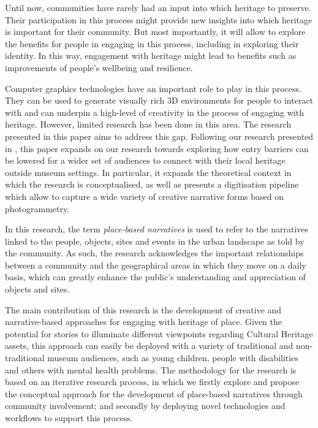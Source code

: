 \documentclass[acmlarge,screen,dvipsnames]{acmart}
\begin{document}
Until now, communities have rarely had an input into which heritage to preserve.
Their participation in this process might provide new insights into which
heritage is important for their community. But most importantly, it will allow to explore the benefits for people in engaging in this process, including in exploring their identity. In this way, engagement with heritage might lead to benefits such as improvements of people's wellbeing and resilience. 


Computer graphics technologies have an important role to play in this process. They can be used to generate visually rich 3D environments for people to interact with and can underpin a high-level of creativity in the process of engaging with heritage. However, limited research has been done in this area.  The research presented in this paper aims to address this gap. Following our research presented in \cite{6b8314fd76a64d3f86fd627505cc29e9}, this paper expands on our research towards exploring how entry barriers can be lowered for a
wider set of audiences to connect with their local heritage outside museum
settings. In particular, it expands the theoretical context in which the research is conceptualised, as well as presents a digitisation pipeline which allow to capture a wide variety of creative narrative forms based on photogrammetry. 

In this research, the term \textit{place-based
narratives} is used to refer to the narratives linked to the
people, objects, sites and events in the urban landscape as told by the
community. As such, the research acknowledges the important relationships
between a community and the geographical areas in which they move on a daily basis, which
can greatly enhance the public's understanding and appreciation of objects and
sites. 

The main contribution of this research is the development of creative and narrative-based
approaches for engaging with heritage of place. Given the potential for stories to illuminate different viewpoints regarding Cultural Heritage assets, this approach can easily be deployed with a variety of traditional and non-traditional museum audiences, such as young children, people with disabilities and others with mental health problems. The methodology for the research is based on an iterative research process, in which we firstly explore and propose the conceptual approach for
the development of place-based narratives through community involvement; and
secondly by deploying novel technologies and workflows to support this process.
\end{document}
